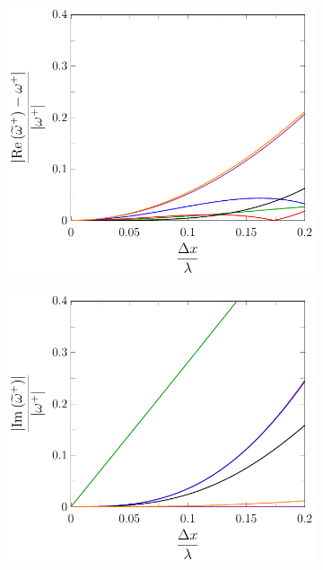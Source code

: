 \begin{figure}
	\centering
	\begin{subfigure}{0.5\textwidth}
		\includegraphics[width=\textwidth]{./chp4/figures/New/ReDispu1Fill.pdf}
	\end{subfigure}%
	\begin{subfigure}{0.5\textwidth}
		\includegraphics[width=\textwidth]{./chp4/figures/New/ImDispu1Fill.pdf}

\end{subfigure}
\end{figure}
